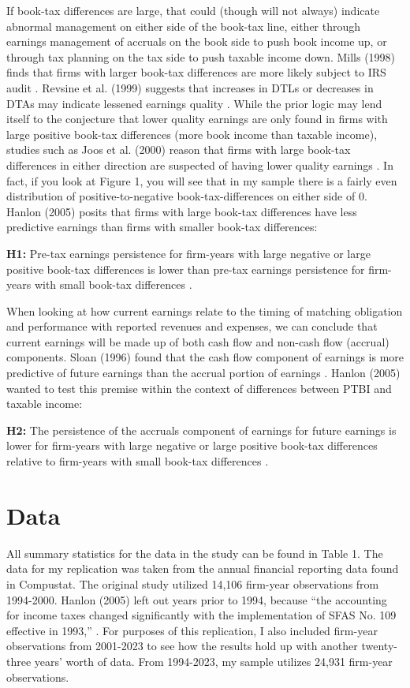\documentclass{article}
\begin{document}
If book-tax differences are large, that could (though will not always) indicate abnormal management on either side of the book-tax line, either through earnings management of accruals on the book side to push book income up, or through tax planning on the tax side to push taxable income down. Mills (1998) finds that firms with larger book-tax differences are more likely subject to IRS audit \citep{Mills98}. Revsine et al. (1999) suggests that increases in DTLs or decreases in DTAs may indicate lessened earnings quality \citep{Revsine99}. While the prior logic may lend itself to the conjecture that lower quality earnings are only found in firms with large positive book-tax differences (more book income than taxable income), studies such as Joos et al. (2000) reason that firms with large book-tax differences in either direction are suspected of having lower quality earnings \citep{Joos00}. In fact, if you look at Figure 1, you will see that in my sample there is a fairly even distribution of positive-to-negative book-tax-differences on either side of 0. Hanlon (2005) posits that firms with large book-tax differences have less predictive earnings than firms with smaller book-tax differences:

\textbf{H1:} Pre-tax earnings persistence for firm-years with large negative or large positive book-tax differences is lower than pre-tax earnings persistence for firm-years with small book-tax differences \citet{Hanlon05}.

When looking at how current earnings relate to the timing of matching obligation and performance with reported revenues and expenses, we can conclude that current earnings will be made up of both cash flow and non-cash flow (accrual) components. Sloan (1996) found that the cash flow component of earnings is more predictive of future earnings than the accrual portion of earnings \citep{Sloan96}. Hanlon (2005) wanted to test this premise within the context of differences between PTBI and taxable income:

\textbf{H2:} The persistence of the accruals component of earnings for future earnings is lower for firm-years with large negative or large positive book-tax differences relative to firm-years with small book-tax differences \citep{Hanlon05}. 

\section{Data}
All summary statistics for the data in the study can be found in Table 1. The data for my replication was taken from the annual financial reporting data found in Compustat. The original study utilized 14,106 firm-year observations from 1994-2000. Hanlon (2005) left out years prior to 1994, because “the accounting for income taxes changed significantly with the implementation of SFAS No. 109 effective in 1993,” \citep{Hanlon05}. For purposes of this replication, I also included firm-year observations from 2001-2023 to see how the results hold up with another twenty-three years’ worth of data. From 1994-2023, my sample utilizes 24,931 firm-year observations.
\end{document}
